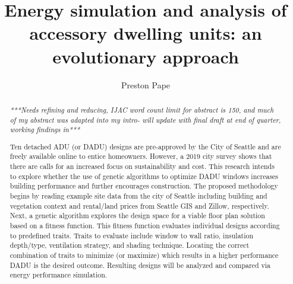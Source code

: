\documentclass[sagev,doublespace,times,Review]{sagej}
\begin{document}

\title{Energy simulation and analysis of accessory dwelling units: 
an evolutionary approach}

\author{Preston Pape}




\begin{abstract}
\textit{***Needs refining and reducing, IJAC word count limit for abstract is 150, and much of my abstract was adapted into my intro- will update with final draft at end of quarter, working findings in***}

Ten detached ADU (or DADU) designs are pre-approved by the City of Seattle and are freely available online to entice homeowners. However, a 2019 city survey shows that there are calls for an increased focus on sustainability and cost. This research intends to explore whether the use of genetic algorithms to optimize DADU windows increases building performance and further encourages construction. The proposed methodology begins by reading example site data from the city of Seattle including building and vegetation context and rental/land prices from Seattle GIS and Zillow, respectively. Next, a genetic algorithm explores the design space for a viable floor plan solution based on a fitness function. This fitness function evaluates individual designs according to predefined traits. Traits to evaluate include window to wall ratio, insulation depth/type, ventilation strategy, and shading technique. Locating the correct combination of traits to minimize (or maximize) which results in a higher performance DADU is the desired outcome. Resulting designs will be analyzed and compared via energy performance simulation. 
\end{abstract}


\maketitle
\end{document}
